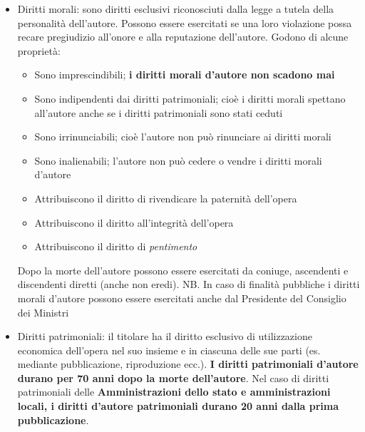 \begin{itemize}
    \item Diritti morali: sono diritti esclusivi riconosciuti dalla legge a tutela della
    personalità dell'autore. Possono essere esercitati se una loro violazione possa recare pregiudizio
    all'onore e alla reputazione dell'autore. Godono di alcune proprietà:
    \begin{itemize}
        \item Sono imprescindibili; \textbf{i diritti morali d'autore non scadono mai}
        \item Sono indipendenti dai diritti patrimoniali; cioè i diritti morali
        spettano all'autore anche se i diritti patrimoniali sono stati ceduti
        \item Sono irrinunciabili; cioè l'autore non può rinunciare ai diritti morali
        \item Sono inalienabili; l'autore non può cedere o vendre i diritti morali d'autore
        \item Attribuiscono il diritto di rivendicare la paternità dell'opera
        \item Attribuiscono il diritto all'integrità dell'opera
        \item Attribuiscono il diritto di \textit{pentimento}
    \end{itemize}
    Dopo la morte dell'autore possono essere esercitati da coniuge, ascendenti e discendenti diretti
    (anche non eredi).\newline
    NB. In caso di finalità pubbliche i diritti morali d'autore possono essere esercitati
    anche dal Presidente del Consiglio dei Ministri
    \item Diritti patrimoniali: il titolare ha il diritto esclusivo di utilizzazione economica
    dell'opera nel suo insieme e in ciascuna delle sue parti (es. mediante pubblicazione, riproduzione ecc.). \newline
    \textbf{I diritti patrimoniali d'autore durano per 70 anni dopo la morte dell'autore}.\newline
    Nel caso di diritti patrimoniali delle \textbf{Amministrazioni dello stato e amministrazioni
    locali, i diritti d'autore patrimoniali durano 20 anni dalla prima pubblicazione}.
\end{itemize}

